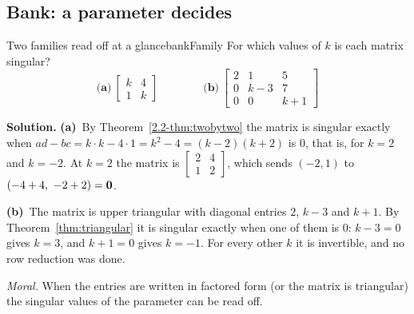 \documentclass[11pt]{article}
\begin{document}
\subsection*{Bank: a parameter decides}

\begin{exmp}{Two families read off at a glance}{bankFamily}
For which values of $k$ is each matrix singular?
\[
\textbf{(a)}\ \begin{bmatrix}k&4\\1&k\end{bmatrix}\qquad\qquad
\textbf{(b)}\ \begin{bmatrix}2&1&5\\0&k-3&7\\0&0&k+1\end{bmatrix}
\]

\textbf{Solution.} \textbf{(a)}~By Theorem~\ref{2.2-thm:twobytwo} the matrix is singular exactly when $ad-bc=k\cdot k-4\cdot1=k^2-4=(k-2)(k+2)$ is $0$, that is, for $k=2$ and $k=-2$. At $k=2$ the matrix is $\begin{bmatrix}2&4\\1&2\end{bmatrix}$, which sends $(-2,1)$ to $(-4+4,\ -2+2)=\mathbf{0}$.

\textbf{(b)}~The matrix is upper triangular with diagonal entries $2$, $k-3$ and $k+1$. By Theorem~\ref{thm:triangular} it is singular exactly when one of them is $0$: $k-3=0$ gives $k=3$, and $k+1=0$ gives $k=-1$. For every other $k$ it is invertible, and no row reduction was done.

\emph{Moral.} When the entries are written in factored form (or the matrix is triangular) the singular values of the parameter can be read off.
\end{exmp}
\end{document}
